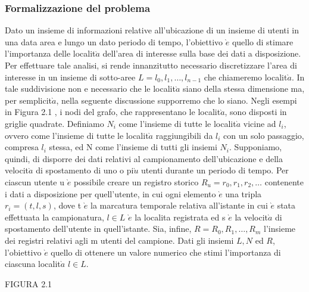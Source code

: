 \subsubsection{Formalizzazione del problema}
Dato un insieme di informazioni relative all'ubicazione di un insieme di utenti
in una data area e lungo un dato periodo di tempo, l'obiettivo $\grave{e}$ quello
di stimare l'importanza delle localit$\grave{a}$ dell'area di interesse sulla base dei dati
a disposizione. Per effettuare tale analisi, si rende innanzitutto necessario
discretizzare l'area di interesse in un insieme di sotto-aree $L = l_{0},l_{1},\dots,l_{n-1}$
che chiameremo localit$\grave{a}$. In tale suddivisione non e necessario che le localit$\grave{a}$
siano della stessa dimensione ma, per semplicit$\grave{a}$, nella seguente discussione
supporremo che lo siano. Negli esempi in Figura 2.1 , i nodi del grafo, che rappresentano
le localit$\grave{a}$, sono disposti in griglie quadrate. Definiamo $N_{i}$ come
l'insieme di tutte le localit$\grave{a}$ vicine ad $l_{i}$, ovvero come l'insieme di tutte le localit$\grave{a}$
 raggiungibili da $l_{i}$ con un solo passaggio, compresa $l_{i}$ stessa, ed N come
l'insieme di tutti gli insiemi $N_{i}$. Supponiamo, quindi, di disporre dei dati relativi
al campionamento dell'ubicazione e della velocit$\grave{a}$ di spostamento di uno
o pi$\grave{u}$ utenti durante un periodo di tempo. Per ciascun utente u $\grave{e}$ possibile
creare un registro storico $R_{u} = r_{0},r_{1},r_{2},\dots$ contenente i dati a disposizione
per quell'utente, in cui ogni elemento $\grave{e}$ una tripla $r_{i} = (t,l,s)$, dove t $\grave{e}$ la marcatura
temporale relativa all'istante in cui $\grave{e}$ stata effettuata la campionatura,
$l \in L$ $\grave{e}$ la localita registrata ed s $\grave{e}$ la velocit$\grave{a}$ di spostamento dell'utente in
quell'istante. Sia, infine, $R = R_{0},R_{1},\dots,R_{m}$ l'insieme dei registri relativi agli m
utenti del campione. Dati gli insiemi $L, N$ ed $R$, l'obiettivo $\grave{e}$ quello di ottenere
un valore numerico che stimi l'importanza di ciascuna localit$\grave{a}$ $l \in L$.

FIGURA  2.1

